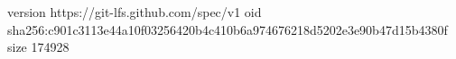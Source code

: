 version https://git-lfs.github.com/spec/v1
oid sha256:c901c3113e44a10f03256420b4c410b6a974676218d5202e3e90b47d15b4380f
size 174928
